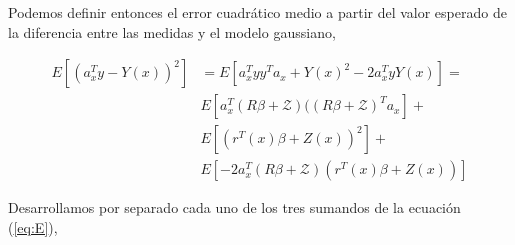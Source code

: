 \documentclass[10pt,a4paper]{report}
\begin{document}
Podemos definir entonces el error cuadrático medio a partir del valor esperado de la diferencia entre las medidas y el modelo gaussiano,

\begin{equation}\label{eq:E}
\begin{split}
E[(a_x^Ty-Y(x))^2] &= E[a_x^Tyy^Ta_x + Y(x)^2 - 2a_x^TyY(x)]=\\
&E[a_x^T(R\beta+\mathcal{Z})((R\beta+\mathcal{Z})^Ta_x] +\\
&E[(r^T(x)\beta+Z(x))^2] +\\
&E[-2a_x^T(R\beta+\mathcal{Z})(r^T(x)\beta+Z(x))]
\end{split}
\end{equation}

Desarrollamos por separado cada uno de los tres sumandos de la ecuación (\ref{eq:E}),
\end{document}

